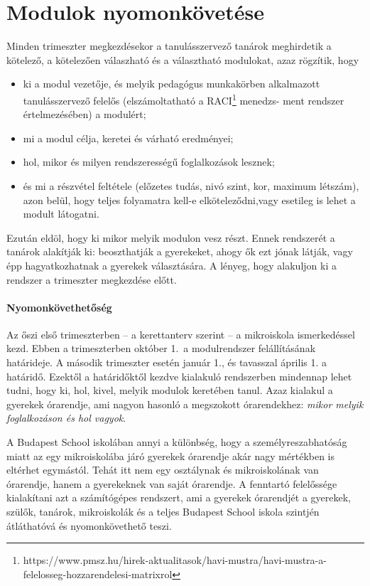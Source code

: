 \section{Modulok nyomonkövetése}
Minden trimeszter megkezdésekor a tanulásszervező tanárok meghirdetik a kötelező, a kötelezően válaszható és a választható modulokat, azaz rögzítik, hogy
\begin{itemize}
    \item ki a modul vezetője, és melyik pedagógus munkakörben
      alkalmazott tanulásszervező felelős (elszámoltatható a
      RACI\footnote{https://www.pmsz.hu/hirek-aktualitasok/havi-mustra/havi-mustra-a-felelosseg-hozzarendelesi-matrixrol}
      me\-nedzs-\linebreak
      ment
      rendszer értelmezésében) a modulért;
    \item mi a modul célja, keretei és várható eredményei;
    \item hol, mikor és milyen rendszerességű foglalkozások lesznek;
    \item és mi a részvétel feltétele (előzetes tudás, nivó szint,
      kor, maximum létszám), azon belül, hogy teljes folyamatra kell-e
      elköteleződni,\linebreak vagy esetileg is lehet a modult látogatni.
\end{itemize}
Ezután eldöl, hogy ki mikor  melyik modulon vesz részt. Ennek rendszerét a tanárok alakítják ki: beoszthatják a gyerekeket, ahogy ők ezt jónak látják, vagy épp hagyatkozhatnak a gyerekek választására. A lényeg, hogy alakuljon ki a rendszer a trimeszter megkezdése előtt.

\paragraph{Nyomonkövethetőség}
Az őszi első trimeszterben  -- a kerettanterv szerint -- a mikroiskola ismerkedéssel kezd. Ebben a trimeszterben október 1.~a modulrendszer felállításának határideje. A második trimeszter esetén január 1., és tavasszal április 1. a határidő. Ezektől a határidőktől kezdve kialakuló rendszerben mindennap lehet tudni, hogy ki, hol, kivel, melyik modulok keretében tanul. Azaz kialakul a gyerekek órarendje, ami nagyon hasonló a megszokott órarendekhez: \emph{mikor melyik foglalkozáson és hol vagyok}.

A Budapest School iskolában annyi a különbség, hogy a személyreszabhatóság miatt az egy mikroiskolába járó gyerekek órarendje akár nagy mértékben is eltérhet egymástól. Tehát itt nem egy osztálynak és mikroiskolának van órarendje, hanem a gyerekeknek van saját órarendje. A fenntartó felelőssége kialakítani azt a számítógépes rendszert, ami a gyerekek órarendjét a gyerekek, szülők, tanárok, mikroiskolák és a teljes Budapest School iskola szintjén átláthatóvá és nyomonkövethető teszi.


